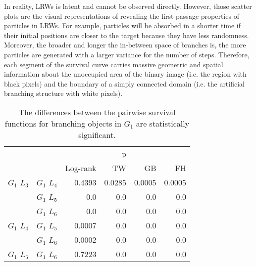        In reality, LRWs is latent and cannot be observed
       directly. However, those scatter plots are the visual
       representations of revealing the first-passage properties of
       particles in LRWs. For example, particles will be absorbed in a
       shorter time if their initial positions are closer to the
       target because they have less randomness. Moreover, the broader
       and longer the in-between space of branches is, the more
       particles are generated with a larger variance for the number
       of steps. Therefore, each segment of the survival curve carries
       massive geometric and spatial information about the unoccupied
       area of the binary image (i.e. the region with black pixels)
       and the boundary of a simply connected domain (i.e. the
       artificial branching structure with white pixels).


       
      \begin{table}
        \centering
        \begin{tabular}{llrrrr}
          \toprule
                       &             &         &  p &    &     \\
          \cmidrule{3-6}
                       &             & Log-rank & TW & GB & FH  \\
          \midrule
          $G_1$ $L_3$  & $G_1$ $L_4$  &  0.4393 &  0.0285 &  0.0005 &  0.0005     \\
                       & $G_1$ $L_5$  & 0.0 & 0.0 & 0.0 & 0.0    \\
                       & $G_1$ $L_6$  & 0.0 & 0.0 & 0.0 & 0.0      \\
          $G_1$ $L_4$  & $G_1$ $L_5$  & 0.0007 & 0.0 & 0.0 & 0.0      \\
                       & $G_1$ $L_6$  & 0.0002 & 0.0 & 0.0 & 0.0       \\
          $G_1$ $L_5$   & $G_1$ $L_6$ & 0.7223 &  0.0 & 0.0 & 0.0      \\
          \bottomrule
        \end{tabular}
        \caption{The differences between the pairwise survival
          functions for branching objects in $G_1$ are statistically
          significant.}
         \label{tab:g1_ingroup_tests_steps}
      \end{table}


